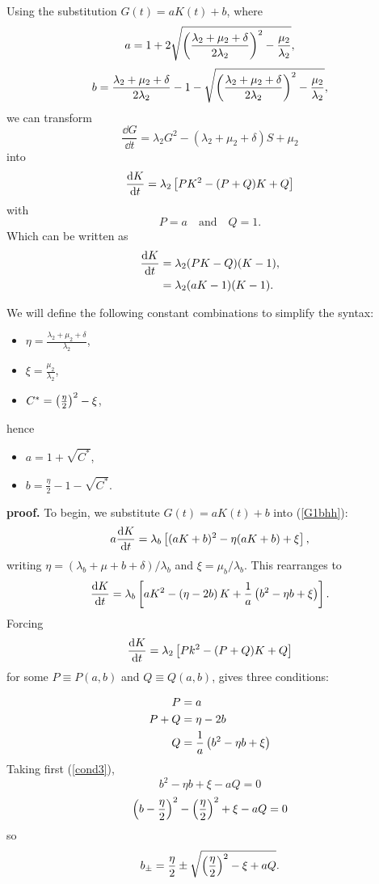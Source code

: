 \begin{lemma}
\label{lemma1}
    Using the substitution $G(t) = aK(t) + b$, where 
    $$a = 1 + 2\sqrt{\left(\frac{\lambda_2+\mu_2+\delta}{2\lambda_2}\right)^2 - \frac{\mu_2}{\lambda_2}},$$
    $$b = \frac{\lambda_2+\mu_2+\delta}{2\lambda_2} -1 - \sqrt{\left(\frac{\lambda_2+\mu_2+\delta}{2\lambda_2}\right)^2 - \frac{\mu_2}{\lambda_2}}, $$
    we can transform
    $$\frac{\dd G}{\dd  t} = \lambda_2 G^2 - (\lambda_2 + \mu_2 + \delta) S +  \mu_2 \label{G1b}$$
    into
    $$\displaystyle\frac{{\rm d} K}{{\rm d} t} = \lambda_2\left[ PK^2 -(P+Q)K + Q\right]$$
    with 
    $$P=a \quad\text{and}\quad Q=1.$$
    Which can be written as
    \begin{align*}
	\displaystyle\frac{{\rm d} K}{{\rm d} t} &= \lambda_2(PK-Q)(K-1),\\
	&= \lambda_2(aK-1)(K-1).
   \end{align*}
\end{lemma}

\noindent
We will define the following constant combinations to simplify the syntax: 
\begin{itemize}
\item $\eta = \frac{\lambda_2+\mu_2+\delta}{\lambda_2}$,
\item $\xi = \frac{\mu_2}{\lambda_2}$,
\item $C^* = \left(\frac{\eta}{2}\right)^2 - \xi $,\\
\end{itemize}
hence
\begin{itemize}
\item $a = 1 + \sqrt{C^*}$,
\item $b = \frac{\eta}{2} - 1 - \sqrt{C^*}$.
\end{itemize}

\vspace{15pt}

\noindent
\textbf{proof.} To begin, we substitute $G(t) = a K(t) + b$ into (\ref{G1bhh}):
    $$a \displaystyle\frac{{\rm d} K}{{\rm d} t} = \lambda_b\left[(aK+b)^2 - \eta(aK+b) + \xi\right],$$
    writing $ \eta = (\lambda_b + \mu+b + \delta) / \lambda_b$ and $\xi = \mu_b / \lambda_ b$. This rearranges to 
    $$ \displaystyle\frac{{\rm d} K}{{\rm d} t} = \lambda_b\left[ a K^2 - \left(\eta - 2b\right) K + \frac{1}{a} \left( b^2 -\eta b + \xi\right)\right].$$
    Forcing 
    \begin{equation}
    \label{conditionFirst}
\displaystyle\frac{{\rm d} K}{{\rm d} t} = \lambda_2 \left[ P k^2 - (P+Q)K + Q\right]
\end{equation}
    for some  $P\equiv P(a,b)$ and $Q\equiv Q(a,b)$, gives three conditions: 
   
  \begin{subequations}\label{eqn:binomi}
    \begin{align}
      P  &= a \label{cond1} \\
      P + Q &= \eta - 2b \label{cond2} \\
      Q&= \frac{1}{a} \left( b^2 - \eta b + \xi\right) \label{cond3}
    \end{align}
  \end{subequations}
  Taking first (\ref{cond3}),
  $$b^2 - \eta b + \xi - aQ = 0$$
  $$\left( b-\frac{\eta}{2}\right)^2 - \left(\frac{\eta}{2}\right)^2 + \xi - aQ = 0$$
  so
  \begin{equation}
  \label{bplusminus}
   b_{\pm} = \frac{\eta}{2} \pm \sqrt{\left(\frac{\eta}{2}\right)^2 -\xi + aQ}.
  \end{equation}
  

